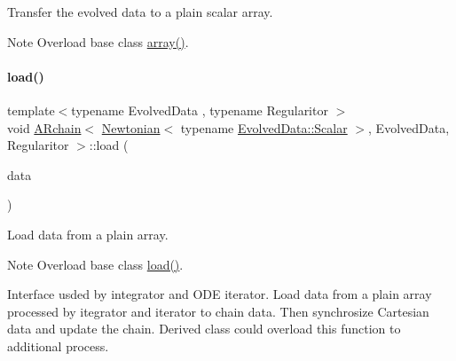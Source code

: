 Transfer the evolved data to a plain scalar array. 

\begin{DoxyNote}{Note}
Overload base class \mbox{\hyperlink{class_a_rchain_3_01_newtonian_3_01typename_01_evolved_data_1_1_scalar_01_4_00_01_evolved_data_00_01_regularitor_01_4_a919d200a913f75719c7240c030b9b113}{array()}}. 
\end{DoxyNote}
\mbox{\label{class_a_rchain_3_01_newtonian_3_01typename_01_evolved_data_1_1_scalar_01_4_00_01_evolved_data_00_01_regularitor_01_4_a8e7bc5b32dbd7a0c9c3541f17fa54e28}} 
\paragraph{\texorpdfstring{load()}{load()}}
{\footnotesize\ttfamily template$<$typename Evolved\+Data , typename Regularitor $>$ \\
void \mbox{\hyperlink{class_a_rchain}{A\+Rchain}}$<$ \mbox{\hyperlink{class_newtonian}{Newtonian}}$<$ typename \mbox{\hyperlink{class_a_rchain_a707e42a79e4744424a34c9007e84ee07}{Evolved\+Data\+::\+Scalar}} $>$, Evolved\+Data, Regularitor $>$\+::load (\begin{DoxyParamCaption}\item[{\mbox{\hyperlink{class_a_rchain_3_01_newtonian_3_01typename_01_evolved_data_1_1_scalar_01_4_00_01_evolved_data_00_01_regularitor_01_4_a8cf940df8dabb6c78662f839c2b13c9a}{Plain\+Array}} \&}]{data }\end{DoxyParamCaption})}



Load data from a plain array. 

\begin{DoxyNote}{Note}
Overload base class \mbox{\hyperlink{class_a_rchain_3_01_newtonian_3_01typename_01_evolved_data_1_1_scalar_01_4_00_01_evolved_data_00_01_regularitor_01_4_a8e7bc5b32dbd7a0c9c3541f17fa54e28}{load()}}.
\end{DoxyNote}
Interface usded by integrator and O\+DE iterator. Load data from a plain array processed by itegrator and iterator to chain data. Then synchrosize Cartesian data and update the chain. Derived class could overload this function to additional process.



